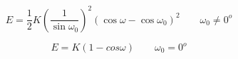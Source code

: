 \documentclass[12pt]{article}
\begin{document}
$$
E=\frac{1}{2}K\left( \frac{1}{\sin\omega_0}\right) ^2 \left( \cos\omega - \cos\omega_0\right) ^2 \qquad \omega_0 \neq 0^o
$$

$$
E=K\left( 1-cos\omega\right)  \qquad \omega_0 = 0^o
$$
\end{document}
